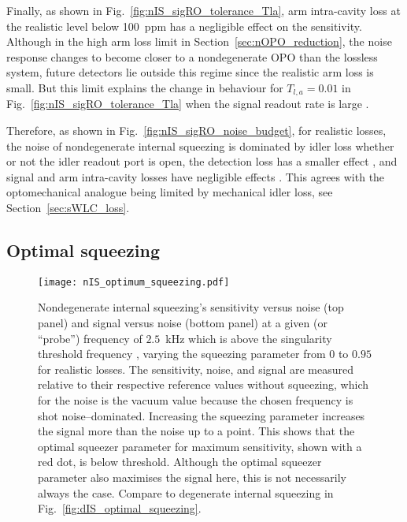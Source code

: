 Finally, as shown in Fig.~\ref{fig:nIS_sigRO_tolerance_Tla}, arm intra-cavity loss at the realistic level below 100~ppm has a negligible  effect on the sensitivity. Although in the high arm loss limit in Section~\ref{sec:nOPO_reduction}, the noise response changes to become closer to a nondegenerate OPO than the lossless system, future detectors lie outside this regime since the realistic arm loss is small. 
But this limit explains the change in behaviour for $T_{l,a}=0.01$  in Fig.~\ref{fig:nIS_sigRO_tolerance_Tla} when the signal readout rate is large .

Therefore, as shown in Fig.~\ref{fig:nIS_sigRO_noise_budget}, for realistic losses, the noise of nondegenerate internal squeezing is dominated by idler loss whether or not the idler readout port is open, the detection loss has a smaller effect , and signal and arm intra-cavity losses have negligible effects . This agrees with the optomechanical analogue being limited by mechanical idler loss, see Section~\ref{sec:sWLC_loss}. 


\subsection{Optimal squeezing}
\label{sec:nIS_optimal_squeezing}

\begin{figure}
	\centering
	\texttt{[image: nIS\_optimum\_squeezing.pdf]}
	\caption{  Nondegenerate internal squeezing's sensitivity versus noise (top panel) and signal versus noise (bottom panel) at a given (or ``probe'') frequency of $2.5$~kHz which is above the singularity threshold frequency , varying the squeezing parameter from $0$ to $0.95$ for realistic losses. The sensitivity, noise, and signal are measured relative to their respective reference values without squeezing, which for the noise is the vacuum value because the chosen frequency is shot noise--dominated. Increasing the squeezing parameter increases the signal more than the noise up to a point. This shows that the optimal squeezer parameter for maximum sensitivity, shown with a red dot, is below threshold. Although the optimal squeezer parameter also maximises the signal here, this is not necessarily always the case. Compare to degenerate internal squeezing in Fig.~\ref{fig:dIS_optimal_squeezing}.}
	\label{fig:nIS_optimum_squeezing}
\end{figure}

